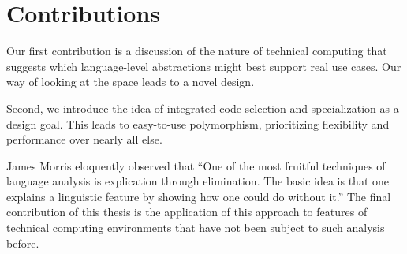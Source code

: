 


\section{Contributions}

Our first contribution is a discussion of the nature of technical computing
that suggests which language-level abstractions might best support real use
cases. Our way of looking at the space leads to a novel design.


Second, we introduce the idea of integrated code selection and specialization
as a design goal. This leads to easy-to-use polymorphism, prioritizing
flexibility and performance over nearly all else.




James Morris eloquently observed that
``One of the most fruitful techniques of language analysis is explication through
elimination. The basic idea is that one explains a linguistic feature by showing
how one could do without it.'' \cite{morris}
The final contribution of this thesis is the application of this approach to features
of technical computing environments that have not been subject to such analysis
before.
